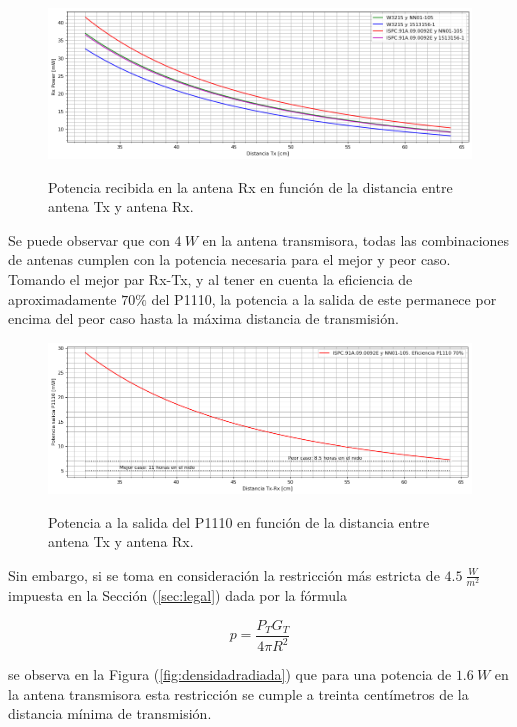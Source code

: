 \begin{figure}[H]
	\centering
	\includegraphics[width=\linewidth]{ImagenesFactibilidad/pot_recibida_teorica}
	\label{fig:pot_recibida_teorica}
	\caption{Potencia recibida en la antena Rx en función de la distancia entre antena Tx y antena Rx.}
\end{figure}

Se puede observar que con $4 \ W$ en la antena transmisora, todas las combinaciones de antenas cumplen con la potencia necesaria para el mejor y peor caso. Tomando el mejor par Rx-Tx, y al tener en cuenta la eficiencia de aproximadamente $70\%$ del P1110, la potencia a la salida de este permanece por encima del peor caso hasta la máxima distancia de transmisión.

\begin{figure}[H]
	\centering
	\includegraphics[width=\linewidth]{ImagenesFactibilidad/pot_baterias_teorica}
	\label{fig:pot_baterias_teorica}
	\caption{Potencia a la salida del P1110 en función de la distancia entre antena Tx y antena Rx.}
\end{figure}

Sin embargo, si se toma en consideración la restricción más estricta de $4.5 \  \frac{W}{m^2}$ impuesta en la Sección (\ref{sec:legal}) dada por la fórmula

\begin{equation}
	p = \frac{P_TG_T}{4\pi R^2}
\end{equation}

se observa en la Figura (\ref{fig:densidadradiada}) que para una potencia de $1.6 \ W$ en la antena transmisora esta restricción se cumple a treinta centímetros de la distancia mínima de transmisión.

